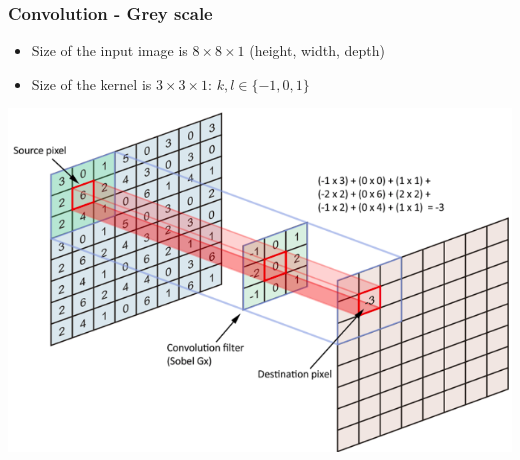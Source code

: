 \begin{frame}
	\frametitle{Convolution - Grey scale}

\begin{itemize}
	\item Size of the input image is $8 \times 8 \times 1$ (height, width, depth)

	\medskip

	\item Size of the kernel is $3 \times 3 \times 1$: $k, l \in \{-1, 0, 1\}$
\end{itemize}

\begin{center}
	\includegraphics[scale=0.3]{figs/convolution.png}
\end{center}

\end{frame}




